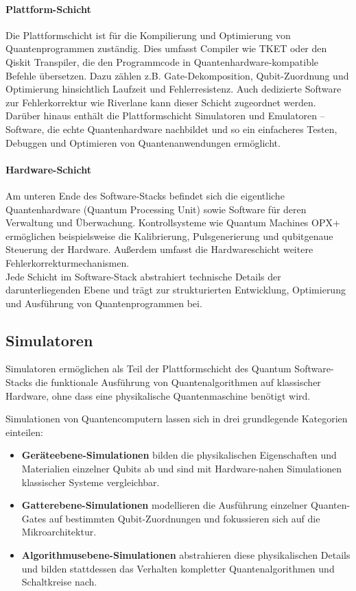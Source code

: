 \paragraph{Plattform-Schicht}  
Die Plattformschicht ist für die Kompilierung und Optimierung von Quantenprogrammen zuständig. Dies umfasst Compiler wie TKET oder den Qiskit Transpiler, die den Programmcode in Quantenhardware-kompatible Befehle übersetzen. Dazu zählen z.B. Gate-Dekomposition, Qubit-Zuordnung und Optimierung hinsichtlich Laufzeit und Fehlerresistenz. Auch dedizierte Software zur Fehlerkorrektur wie Riverlane kann dieser Schicht zugeordnet werden. Darüber hinaus enthält die Plattformschicht Simulatoren und Emulatoren -- Software, die echte Quantenhardware nachbildet und so ein einfacheres Testen, Debuggen und Optimieren von Quantenanwendungen ermöglicht.
\\

\paragraph{Hardware-Schicht}  
Am unteren Ende des Software-Stacks befindet sich die eigentliche Quantenhardware (Quantum Processing Unit) sowie Software für deren Verwaltung und Überwachung. Kontrollsysteme wie Quantum Machines OPX+ ermöglichen beispielsweise die Kalibrierung, Pulsgenerierung und qubitgenaue Steuerung der Hardware. Außerdem umfasst die Hardwareschicht weitere Fehlerkorrekturmechanismen.
\\

Jede Schicht im Software-Stack abstrahiert technische Details der darunterliegenden Ebene und trägt zur strukturierten Entwicklung, Optimierung und Ausführung von Quantenprogrammen bei. \autocite{shehata_building_2025} \autocite{ryan_understanding_2024}

\subsection{Simulatoren}
\label{sec:simulators}

Simulatoren ermöglichen als Teil der Plattformschicht des Quantum Software-Stacks die funktionale Ausführung von Quantenalgorithmen auf klassischer Hardware, ohne dass eine physikalische Quantenmaschine benötigt wird.

Simulationen von Quantencomputern lassen sich in drei grundlegende Kategorien einteilen:
\begin{itemize}
\item \textbf{Geräteebene-Simulationen} bilden die physikalischen Eigenschaften und Materialien einzelner Qubits ab und sind mit Hardware-nahen Simulationen klassischer Systeme vergleichbar.
\item \textbf{Gatterebene-Simulationen} modellieren die Ausführung einzelner Quanten-Gates auf bestimmten Qubit-Zuordnungen und fokussieren sich auf die Mikroarchitektur.
\item \textbf{Algorithmusebene-Simulationen} abstrahieren diese physikalischen Details und bilden stattdessen das Verhalten kompletter Quantenalgorithmen und Schaltkreise nach.
\end{itemize}

